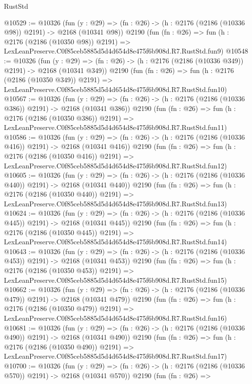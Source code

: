 \begin{lexlean}{RustStd}
\begin{coremodule}
@10529 := @10326
    (fun (y : @29) => (fn : @26) -> (h : @2176 (@2186 (@10336 @98)) @2191) -> @2168 (@10341 @98))
    @2190
    (fun (fn : @26) =>
    fun (h : @2176 (@2186 (@10350 @98)) @2191) =>
    LexLeanPreserve.C0f85ceb5885d5d4d654d8e475f6b908d.R7.RustStd.fun9)
@10548 := @10326
    (fun (y : @29) => (fn : @26) -> (h : @2176 (@2186 (@10336 @349)) @2191) -> @2168 (@10341 @349))
    @2190
    (fun (fn : @26) =>
    fun (h : @2176 (@2186 (@10350 @349)) @2191) =>
    LexLeanPreserve.C0f85ceb5885d5d4d654d8e475f6b908d.R7.RustStd.fun10)
@10567 := @10326
    (fun (y : @29) => (fn : @26) -> (h : @2176 (@2186 (@10336 @386)) @2191) -> @2168 (@10341 @386))
    @2190
    (fun (fn : @26) =>
    fun (h : @2176 (@2186 (@10350 @386)) @2191) =>
    LexLeanPreserve.C0f85ceb5885d5d4d654d8e475f6b908d.R7.RustStd.fun11)
@10586 := @10326
    (fun (y : @29) => (fn : @26) -> (h : @2176 (@2186 (@10336 @416)) @2191) -> @2168 (@10341 @416))
    @2190
    (fun (fn : @26) =>
    fun (h : @2176 (@2186 (@10350 @416)) @2191) =>
    LexLeanPreserve.C0f85ceb5885d5d4d654d8e475f6b908d.R7.RustStd.fun12)
@10605 := @10326
    (fun (y : @29) => (fn : @26) -> (h : @2176 (@2186 (@10336 @440)) @2191) -> @2168 (@10341 @440))
    @2190
    (fun (fn : @26) =>
    fun (h : @2176 (@2186 (@10350 @440)) @2191) =>
    LexLeanPreserve.C0f85ceb5885d5d4d654d8e475f6b908d.R7.RustStd.fun13)
@10624 := @10326
    (fun (y : @29) => (fn : @26) -> (h : @2176 (@2186 (@10336 @445)) @2191) -> @2168 (@10341 @445))
    @2190
    (fun (fn : @26) =>
    fun (h : @2176 (@2186 (@10350 @445)) @2191) =>
    LexLeanPreserve.C0f85ceb5885d5d4d654d8e475f6b908d.R7.RustStd.fun14)
@10643 := @10326
    (fun (y : @29) => (fn : @26) -> (h : @2176 (@2186 (@10336 @453)) @2191) -> @2168 (@10341 @453))
    @2190
    (fun (fn : @26) =>
    fun (h : @2176 (@2186 (@10350 @453)) @2191) =>
    LexLeanPreserve.C0f85ceb5885d5d4d654d8e475f6b908d.R7.RustStd.fun15)
@10662 := @10326
    (fun (y : @29) => (fn : @26) -> (h : @2176 (@2186 (@10336 @479)) @2191) -> @2168 (@10341 @479))
    @2190
    (fun (fn : @26) =>
    fun (h : @2176 (@2186 (@10350 @479)) @2191) =>
    LexLeanPreserve.C0f85ceb5885d5d4d654d8e475f6b908d.R7.RustStd.fun16)
@10681 := @10326
    (fun (y : @29) => (fn : @26) -> (h : @2176 (@2186 (@10336 @490)) @2191) -> @2168 (@10341 @490))
    @2190
    (fun (fn : @26) =>
    fun (h : @2176 (@2186 (@10350 @490)) @2191) =>
    LexLeanPreserve.C0f85ceb5885d5d4d654d8e475f6b908d.R7.RustStd.fun17)
@10700 := @10326
    (fun (y : @29) => (fn : @26) -> (h : @2176 (@2186 (@10336 @570)) @2191) -> @2168 (@10341 @570))
    @2190
    (fun (fn : @26) =>

\end{coremodule}
\end{lexlean}
